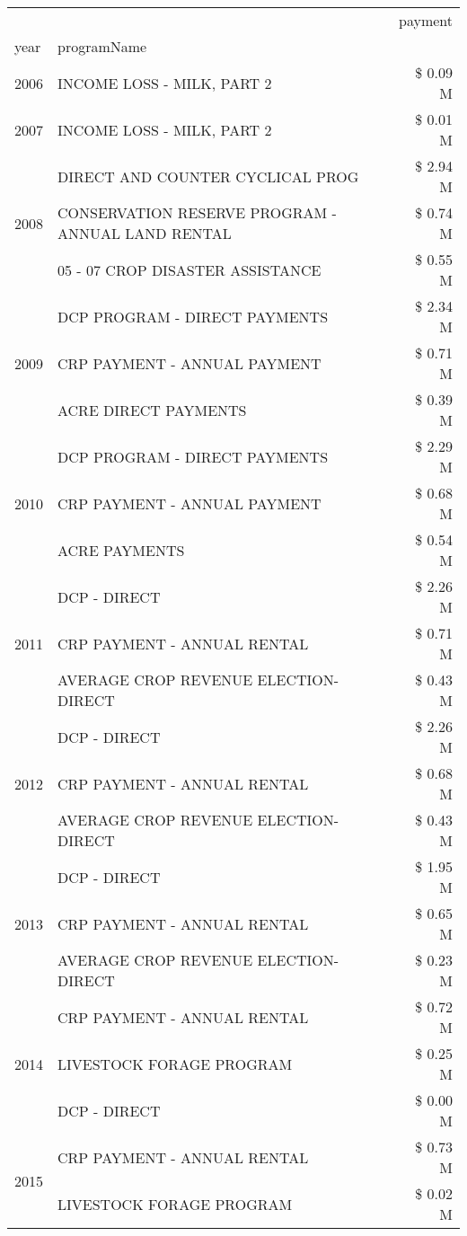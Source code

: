 \begin{tabular}{llr}
\toprule
 &  & payment \\
year & programName &  \\
\midrule
2006 & INCOME LOSS - MILK, PART 2 & \$ 0.09 M \\
\cline{1-3}
2007 & INCOME LOSS - MILK, PART 2 & \$ 0.01 M \\
\cline{1-3}
\multirow[t]{3}{*}{2008} & DIRECT AND COUNTER CYCLICAL PROG & \$ 2.94 M \\
 & CONSERVATION RESERVE PROGRAM - ANNUAL LAND RENTAL & \$ 0.74 M \\
 & 05 - 07 CROP DISASTER ASSISTANCE & \$ 0.55 M \\
\cline{1-3}
\multirow[t]{3}{*}{2009} & DCP PROGRAM - DIRECT PAYMENTS & \$ 2.34 M \\
 & CRP PAYMENT - ANNUAL PAYMENT & \$ 0.71 M \\
 & ACRE DIRECT PAYMENTS & \$ 0.39 M \\
\cline{1-3}
\multirow[t]{3}{*}{2010} & DCP PROGRAM - DIRECT PAYMENTS & \$ 2.29 M \\
 & CRP PAYMENT - ANNUAL PAYMENT & \$ 0.68 M \\
 & ACRE PAYMENTS & \$ 0.54 M \\
\cline{1-3}
\multirow[t]{3}{*}{2011} & DCP - DIRECT & \$ 2.26 M \\
 & CRP PAYMENT - ANNUAL RENTAL & \$ 0.71 M \\
 & AVERAGE CROP REVENUE ELECTION-DIRECT & \$ 0.43 M \\
\cline{1-3}
\multirow[t]{3}{*}{2012} & DCP - DIRECT & \$ 2.26 M \\
 & CRP PAYMENT - ANNUAL RENTAL & \$ 0.68 M \\
 & AVERAGE CROP REVENUE ELECTION-DIRECT & \$ 0.43 M \\
\cline{1-3}
\multirow[t]{3}{*}{2013} & DCP - DIRECT & \$ 1.95 M \\
 & CRP PAYMENT - ANNUAL RENTAL & \$ 0.65 M \\
 & AVERAGE CROP REVENUE ELECTION-DIRECT & \$ 0.23 M \\
\cline{1-3}
\multirow[t]{3}{*}{2014} & CRP PAYMENT - ANNUAL RENTAL & \$ 0.72 M \\
 & LIVESTOCK FORAGE PROGRAM & \$ 0.25 M \\
 & DCP - DIRECT & \$ 0.00 M \\
\cline{1-3}
\multirow[t]{3}{*}{2015} & CRP PAYMENT - ANNUAL RENTAL & \$ 0.73 M \\
 & LIVESTOCK FORAGE PROGRAM & \$ 0.02 M \\

\end{tabular}
